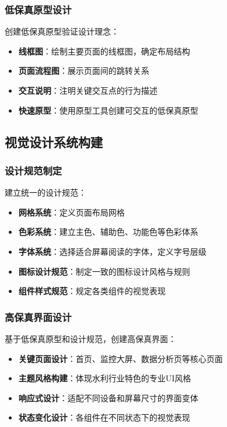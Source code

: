 \subsubsection{低保真原型设计}\label{ux4f4eux4fddux771fux539fux578bux8bbeux8ba1}

创建低保真原型验证设计理念：

\begin{itemize}
\tightlist
\item
  \textbf{线框图}：绘制主要页面的线框图，确定布局结构
\item
  \textbf{页面流程图}：展示页面间的跳转关系
\item
  \textbf{交互说明}：注明关键交互点的行为描述
\item
  \textbf{快速原型}：使用原型工具创建可交互的低保真原型
\end{itemize}

\subsection{视觉设计系统构建}\label{ux89c6ux89c9ux8bbeux8ba1ux7cfbux7edfux6784ux5efa}

\subsubsection{设计规范制定}\label{ux8bbeux8ba1ux89c4ux8303ux5236ux5b9a}

建立统一的设计规范：

\begin{itemize}
\tightlist
\item
  \textbf{网格系统}：定义页面布局网格
\item
  \textbf{色彩系统}：建立主色、辅助色、功能色等色彩体系
\item
  \textbf{字体系统}：选择适合屏幕阅读的字体，定义字号层级
\item
  \textbf{图标设计规范}：制定一致的图标设计风格与规则
\item
  \textbf{组件样式规范}：规定各类组件的视觉表现
\end{itemize}

\subsubsection{高保真界面设计}\label{ux9ad8ux4fddux771fux754cux9762ux8bbeux8ba1}

基于低保真原型和设计规范，创建高保真界面：

\begin{itemize}
\tightlist
\item
  \textbf{关键页面设计}：首页、监控大屏、数据分析页等核心页面
\item
  \textbf{主题风格构建}：体现水利行业特色的专业UI风格
\item
  \textbf{响应式设计}：适配不同设备和屏幕尺寸的界面变体
\item
  \textbf{状态变化设计}：各组件在不同状态下的视觉表现
\end{itemize}

